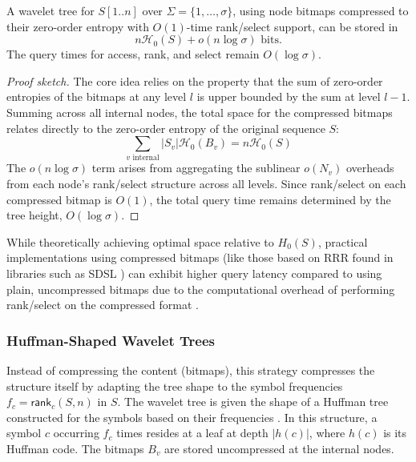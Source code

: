 \begin{theorem} \label{thm:h0_bitmap_wt_space}
    A wavelet tree for $S[1..n]$ over $\Sigma=\{1,\dots,\sigma\}$, using node bitmaps compressed to their zero-order entropy with $O(1)$-time rank/select support, can be stored in
    \[ n \mathcal{H}_0(S) + o(n \log \sigma) \text{ bits}. \]
    The query times for \textsf{access}, \textsf{rank}, and \textsf{select} remain $O(\log \sigma)$.
\end{theorem}
\begin{proof}[Proof sketch]
    The core idea relies on the property that the sum of zero-order entropies of the bitmaps at any level $l$ is upper bounded by the sum at level $l-1$. Summing across all internal nodes, the total space for the compressed bitmaps relates directly to the zero-order entropy of the original sequence $S$:
    \[\sum_{v \text{ internal}} |S_v| \mathcal{H}_0(B_v) = n \mathcal{H}_0(S)\]
    The $o(n \log \sigma)$ term arises from aggregating the sublinear $o(N_v)$ overheads from each node's rank/select structure across all levels. Since rank/select on each compressed bitmap is $O(1)$, the total query time remains determined by the tree height, $O(\log \sigma)$.
\end{proof}

While theoretically achieving optimal space relative to $H_0(S)$, practical implementations using compressed bitmaps (like those based on RRR found in libraries such as SDSL \cite{gog2014theory}) can exhibit higher query latency compared to using plain, uncompressed bitmaps due to the computational overhead of performing rank/select on the compressed format \cite{claude2015wavelet}.

\subsubsection{Huffman-Shaped Wavelet Trees} \label{subsec:huffman_shaped_wavelet_trees}

Instead of compressing the content (bitmaps), this strategy compresses the structure itself by adapting the tree shape to the symbol frequencies $f_c = \textsf{rank}_c(S, n)$ in $S$. The wavelet tree is given the shape of a Huffman tree \cite{huffman1952method} constructed for the symbols based on their frequencies \cite{grossi2004indexing, makinen2004new}. In this structure, a symbol $c$ occurring $f_c$ times resides at a leaf at depth $|h(c)|$, where $h(c)$ is its Huffman code. The bitmaps $B_v$ are stored uncompressed at the internal nodes.

